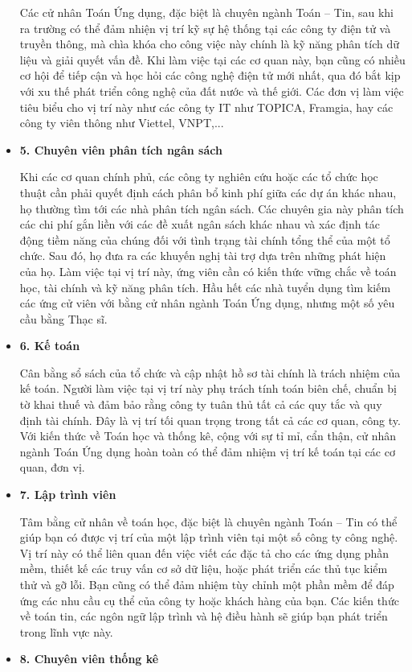 \documentclass[12pt,a4paper]{report}
\begin{document}
\begin{itemize}
    Các cử nhân Toán Ứng dụng, đặc biệt là chuyên ngành Toán – Tin, sau khi ra trường có thể đảm nhiện vị trí kỹ sự hệ thống tại các công ty điện tử và truyền thông, mà chìa khóa cho công việc này chính là kỹ năng phân tích dữ liệu và giải quyết vấn đề. Khi làm việc tại các cơ quan này, bạn cũng có nhiều cơ hội để tiếp cận và học hỏi các công nghệ điện tử mới nhất, qua đó bắt kịp với xu thế phát triển công nghệ của đất nước và thế giới. Các đơn vị làm việc tiêu biểu cho vị trí này như các công ty IT như TOPICA, Framgia, hay các công ty viên thông như Viettel, VNPT,...
    \item{\bf5. Chuyên viên phân tích ngân sách}
    
    Khi các cơ quan chính phủ, các công ty nghiên cứu hoặc các tổ chức học thuật cần phải quyết định cách phân bổ kinh phí giữa các dự án khác nhau, họ thường tìm tới các nhà phân tích ngân sách. Các chuyên gia này phân tích các chi phí gắn liền với các đề xuất ngân sách khác nhau và xác định tác động tiềm năng của chúng đối với tình trạng tài chính tổng thể của một tổ chức. Sau đó, họ đưa ra các khuyến nghị tài trợ dựa trên những phát hiện của họ. Làm việc tại vị trí này, ứng viên cần có kiến thức vững chắc về toán học, tài chính và kỹ năng phân tích. Hầu hết các nhà tuyển dụng tìm kiếm các ứng cử viên với bằng cử nhân ngành Toán Ứng dụng, nhưng một số yêu cầu bằng Thạc sĩ.
    \item{\bf6. Kế toán}
    
    Cân bằng sổ sách của tổ chức và cập nhật hồ sơ tài chính là trách nhiệm của kế toán. Người làm việc tại vị trí này phụ trách tính toán biên chế, chuẩn bị tờ khai thuế và đảm bảo rằng công ty tuân thủ tất cả các quy tắc và quy định tài chính. Đây là vị trí tối quan trọng trong tất cả các cơ quan, công ty. Với kiến thức về Toán học và thống kê, cộng với sự tỉ mỉ, cẩn thận, cử nhân ngành Toán Ứng dụng hoàn toàn có thể đảm nhiệm vị trí kế toán tại các cơ quan, đơn vị. 
    \item{\bf7. Lập trình viên}
    
    Tâm bằng cử nhân về toán học, đặc biệt là chuyên ngành Toán – Tin có thể giúp bạn có được vị trí của một lập trình viên tại một số công ty công nghệ. Vị trí này có thể liên quan đến việc viết các đặc tả cho các ứng dụng phần mềm, thiết kế các truy vấn cơ sở dữ liệu, hoặc phát triển các thủ tục kiểm thử và gỡ lỗi. Bạn cũng có thể đảm nhiệm tùy chỉnh một phần mềm để đáp ứng các nhu cầu cụ thể của công ty hoặc khách hàng của bạn. Các kiến thức về toán tin, các ngôn ngữ lập trình và hệ điều hành sẽ giúp bạn phát triển trong lĩnh vực này. 
    \item{\bf8. Chuyên viên thống kê}
    

\end{itemize}
\end{document}
